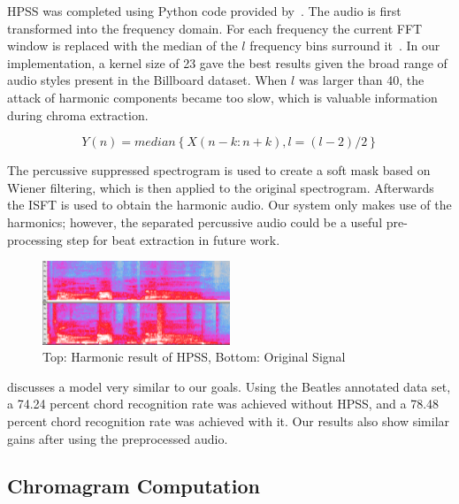 \documentclass{article}
\begin{document}
HPSS was completed using Python code provided by~\cite{librosa:24}. The audio
is first transformed into the frequency domain. For each frequency the current
FFT window is replaced with the median of the $l$ frequency bins surround
it~\cite{FitzGerald:11}. In our implementation, a kernel size of 23 gave the
best results given the broad range of audio styles present in the Billboard
dataset. When $l$ was larger than 40, the attack of harmonic components became
too slow, which is valuable information during chroma extraction.

$$ Y(n) = median \left \{X(n-k:n+k),l = (l-2)/2  \right \} $$

The percussive suppressed spectrogram is used to create a soft mask based on
Wiener filtering, which is then applied to the original spectrogram. Afterwards
the ISFT is used to obtain the harmonic audio. Our system only makes use of the
harmonics; however, the  separated percussive audio could be a useful
pre-processing step for beat extraction in future work.

\begin{figure}
   \centering
    \includegraphics[width=0.5\textwidth]{hpssspec.png}
   \caption{Top: Harmonic result of HPSS, Bottom: Original Signal}\label{fig:HPSS}
\end{figure}


\cite{Ueda:19} discusses a model very similar to our goals. Using the
Beatles annotated data set, a 74.24 percent chord recognition rate was achieved
without HPSS, and a 78.48 percent chord recognition rate was achieved with it.
Our results also show similar gains after using the preprocessed audio.

\subsection{Chromagram Computation}
\end{document}
